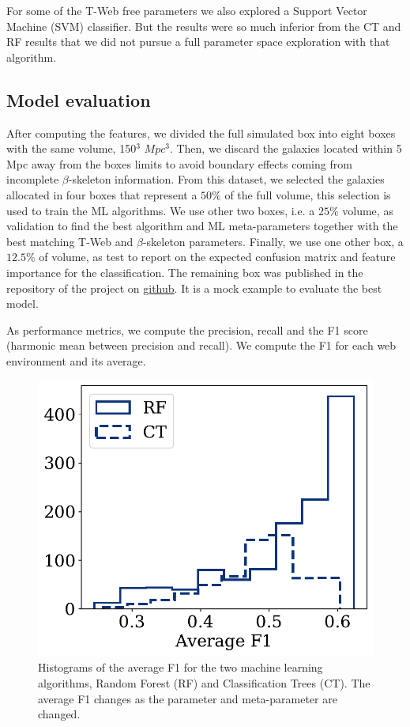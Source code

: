 \documentclass[usenatbib]{mnras}
\begin{document}
For some of the T-Web free parameters we also explored a Support Vector Machine (SVM) classifier. 
But the results were so much inferior from the CT and RF results that we did not pursue a full parameter space exploration with that algorithm.


\subsection{Model evaluation}

After computing the features, we divided the full simulated box into eight boxes with the same volume, 150$^3$ $Mpc^3$. Then, we discard the galaxies located within 5 Mpc away from the boxes limits to avoid boundary effects coming from incomplete $\beta$-skeleton information.  
From this dataset, we selected the galaxies allocated in four boxes that represent a $50\%$ of the full volume, this selection is used to train the ML algorithms.
We use other two boxes, i.e. a $25\%$ volume, as validation to find the best algorithm and ML
meta-parameters together with the best matching T-Web and
$\beta$-skeleton parameters.   
Finally, we use one other box, a $12.5\%$ of volume, as test to report
on the expected confusion matrix and feature importance for the classification. The remaining box was published in the repository of the project on \href{https://github.com/jsuarez314/cosmicweb_bsk}{github}. It is a mock example to evaluate the best model.

As performance metrics, we compute the precision, recall and the F1
score (harmonic mean between precision and recall).  
We compute the F1 for each web environment and its average.


\begin{figure}
    \includegraphics[scale=0.55]{Figs/p_hist_f1.pdf}
    \caption{Histograms of the average F1 for the two machine
      learning algorithms, Random Forest (RF) and Classification Trees (CT).
      The average F1 changes as the parameter and meta-parameter are changed.}
    \label{fig:methods}
\end{figure}
\end{document}
